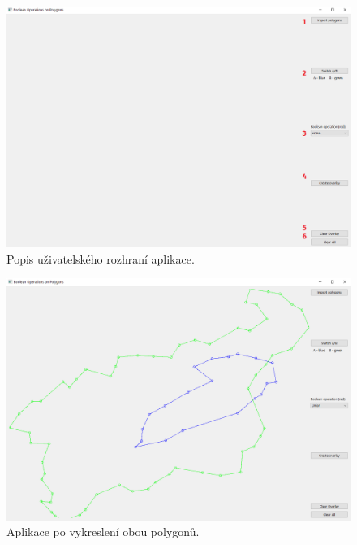 \documentclass[a4paper, 12pt, oneside, titlepage]{article} %
\begin{document}
\begin{figure}[!htb]
	\centering
	\includegraphics[scale=0.4]{obrazky/popis_aplikace.png} 
	\caption{Popis uživatelského rozhraní aplikace.
	}
	\label{fig:popis_aplikace}
\end{figure} 
\FloatBarrier


\begin{figure}[!htb]
	\centering
	\includegraphics[scale=0.4]{obrazky/start.png} 
	\caption{Aplikace po vykreslení obou polygonů.
	}
	\label{fig:start}
\end{figure} 
\FloatBarrier
\end{document}
